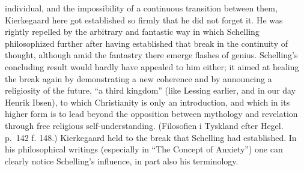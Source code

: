 \documentclass[12pt,a4paper]{book}
\newcommand{\opage}[1]{\marginnote{\footnotesize\textit{[#1]}}}
\begin{document}
individual, and the impossibility of a continuous transition between
them, Kierkegaard here got established so firmly that he did not forget
it. He was rightly repelled by the
\opage{56}arbitrary and fantastic way in which Schelling philosophized further
after having established that break in the continuity of thought,
although amid the fantastry there emerge flashes of genius. Schelling's
concluding result would hardly have appealed to him either; it aimed at
healing the break again by demonstrating a new coherence and by
announcing a religiosity of the future, ``a third kingdom'' (like Lessing
earlier, and in our day Henrik Ibsen), to which Christianity is only an
introduction, and which in its higher form is to lead beyond the
opposition between mythology and revelation through free religious
self-understanding.
(Filosofien i Tyskland efter Hegel. p.~142 f. 148.) Kierkegaard held to
the break that Schelling had established. In his philosophical writings
(especially in ``The Concept of Anxiety'') one can clearly notice
Schelling's influence, in part also his terminology.
\end{document}
